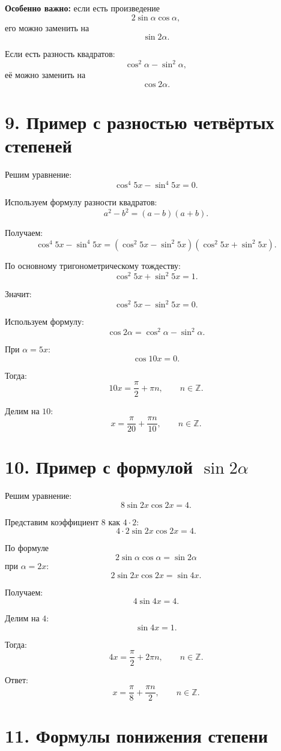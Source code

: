 \documentclass[a4paper,12pt]{article}
\newcommand{\topic}[1]{\textcolor{darkaccent}{\textbf{#1}}}
\newcommand{\Z}{\mathbb{Z}}
\begin{document}
\topic{Особенно важно:}
если есть произведение
\[
    2\sin\alpha\cos\alpha,
\]
его можно заменить на
\[
    \sin 2\alpha.
\]

Если есть разность квадратов:
\[
    \cos^2\alpha-\sin^2\alpha,
\]
её можно заменить на
\[
    \cos 2\alpha.
\]

\section*{9. Пример с разностью четвёртых степеней}

Решим уравнение:
\[
    \cos^4 5x-\sin^4 5x=0.
\]

Используем формулу разности квадратов:
\[
    a^2-b^2=(a-b)(a+b).
\]

Получаем:
\[
    \cos^4 5x-\sin^4 5x
    =
    (\cos^2 5x-\sin^2 5x)(\cos^2 5x+\sin^2 5x).
\]

По основному тригонометрическому тождеству:
\[
    \cos^2 5x+\sin^2 5x=1.
\]

Значит:
\[
    \cos^2 5x-\sin^2 5x=0.
\]

Используем формулу:
\[
    \cos 2\alpha=\cos^2\alpha-\sin^2\alpha.
\]

При \(\alpha=5x\):
\[
    \cos 10x=0.
\]

Тогда:
\[
    10x=\frac{\pi}{2}+\pi n,\qquad n\in\Z.
\]

Делим на \(10\):
\[
    \boxed{x=\frac{\pi}{20}+\frac{\pi n}{10},\qquad n\in\Z.}
\]

\section*{10. Пример с формулой \(\sin 2\alpha\)}

Решим уравнение:
\[
    8\sin 2x\cos 2x=4.
\]

Представим коэффициент \(8\) как \(4\cdot2\):
\[
    4\cdot 2\sin 2x\cos 2x=4.
\]

По формуле
\[
    2\sin\alpha\cos\alpha=\sin 2\alpha
\]
при \(\alpha=2x\):
\[
    2\sin 2x\cos 2x=\sin 4x.
\]

Получаем:
\[
    4\sin 4x=4.
\]

Делим на \(4\):
\[
    \sin 4x=1.
\]

Тогда:
\[
    4x=\frac{\pi}{2}+2\pi n,\qquad n\in\Z.
\]

Ответ:
\[
    \boxed{x=\frac{\pi}{8}+\frac{\pi n}{2},\qquad n\in\Z.}
\]

\section*{11. Формулы понижения степени}
\end{document}
